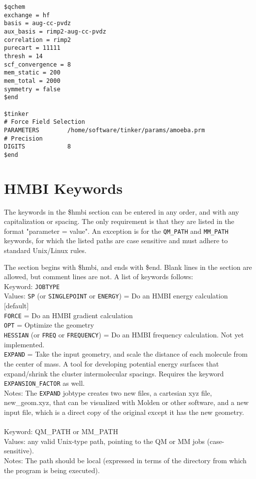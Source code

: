 \documentclass[11pt,letterpaper]{article}
\begin{document}
\begin{spacing}{1.0}
\begin{verbatim}
$qchem
exchange = hf
basis = aug-cc-pvdz
aux_basis = rimp2-aug-cc-pvdz
correlation = rimp2
purecart = 11111
thresh = 14
scf_convergence = 8
mem_static = 200
mem_total = 2000
symmetry = false
$end

$tinker         
# Force Field Selection
PARAMETERS        /home/software/tinker/params/amoeba.prm
# Precision         
DIGITS            8
$end            
\end{verbatim}



\section{HMBI Keywords {\label{HMBI_keywords}}}

The keywords in the \$hmbi section can be entered in any order, and with 
any capitalization or spacing.  The only requirement is that they are 
listed in the format "parameter = value".  An exception is for the 
{\tt QM\_PATH} and {\tt MM\_PATH} keywords, for which the listed paths are case 
sensitive and must adhere to standard Unix/Linux rules.

The section begins with \$hmbi, and ends with \$end.  Blank lines in 
the section are allowed, but comment lines are not. A list of keywords follows:
\\

\noindent
Keyword: {\tt JOBTYPE} \\
Values:  {\tt SP} (or {\tt SINGLEPOINT} or {\tt ENERGY}) = Do an HMBI 
         energy calculation [default] \\
	 {\tt FORCE} = Do an HMBI gradient calculation \\
         {\tt OPT} = Optimize the geometry \\
	 {\tt HESSIAN} (or {\tt FREQ} or {\tt FREQUENCY}) = 
         Do an HMBI frequency calculation.  Not yet implemented.\\
	 {\tt EXPAND} = Take the input geometry, and scale the distance of each
	 molecule from the center of mass.  A tool for developing potential
	 energy surfaces that expand/shrink the cluster intermolecular spacings.
	 Requires the keyword {\tt EXPANSION\_FACTOR}  as well. \\
Notes:   The {\tt EXPAND} jobtype creates two new files, a cartesian xyz file,
	 new\_geom.xyz, that can be visualized with Molden or other software,
	 and a new input file, which is a direct copy of the original except
	 it has the new geometry. \\ \\ 
\noindent
Keyword: QM\_PATH or MM\_PATH \\
Values:  any valid Unix-type path, pointing to the QM or MM jobs 
	 (case-sensitive). \\
Notes:   The path should be local (expressed in terms of the directory from
	 which the program is being executed). \\


\end{spacing}
\end{document}
